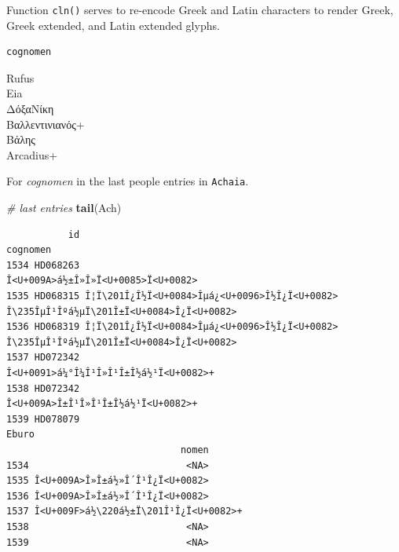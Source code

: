 \documentclass[a4paper,11pt]{memoir}
\newenvironment{Shaded}{\begin{snugshade}}{\end{snugshade}}
\newcommand{\CommentTok}[1]{\textcolor[rgb]{0.56,0.35,0.01}{\textit{#1}}}
\newcommand{\ErrorTok}[1]{\textcolor[rgb]{0.64,0.00,0.00}{\textbf{#1}}}
\newcommand{\KeywordTok}[1]{\textcolor[rgb]{0.13,0.29,0.53}{\textbf{#1}}}
\newcommand{\NormalTok}[1]{#1}
\newcommand{\OperatorTok}[1]{\textcolor[rgb]{0.81,0.36,0.00}{\textbf{#1}}}
\newcommand{\StringTok}[1]{\textcolor[rgb]{0.31,0.60,0.02}{#1}}
\begin{document}
Function \texttt{cln()} serves to re-encode Greek and Latin characters
to render Greek, Greek extended, and Latin extended glyphs.

\begin{Shaded}
\end{Shaded}

\begin{verbatim}
cognomen
\end{verbatim}

\noindent
Rufus \\
Eia \\
ΔόξαΝίκη \\
Βαλλεντινιανός+ \\
Βάλης \\
Arcadius+ \\

\bigbreak 

For \emph{cognomen} in the last people entries in \texttt{Achaia}.

\begin{Shaded}
\begin{Highlighting}[]
\CommentTok{# last entries}
\KeywordTok{tail}\NormalTok{(Ach)}
\end{Highlighting}
\end{Shaded}

\begin{verbatim}
           id                                                                       cognomen
1534 HD068263                                             Î<U+009A>á½±Î»Î»Ï<U+0085>Ï<U+0082>
1535 HD068315 Î¦Ï\201Î¿Î½Ï<U+0084>Îµá¿<U+0096>Î½Î¿Ï<U+0082> Î\235ÎµÎ¹Îºá½µÏ\201Î±Ï<U+0084>Î¿Ï<U+0082>
1536 HD068319 Î¦Ï\201Î¿Î½Ï<U+0084>Îµá¿<U+0096>Î½Î¿Ï<U+0082> Î\235ÎµÎ¹Îºá½µÏ\201Î±Ï<U+0084>Î¿Ï<U+0082>
1537 HD072342                                          Î<U+0091>á¼°Î¼Î¹Î»Î¹Î±Î½á½¹Ï<U+0082>+
1538 HD072342                                             Î<U+009A>Î±Î¹Î»Î¹Î±Î½á½¹Ï<U+0082>+
1539 HD078079                                                                          Eburo
                               nomen
1534                            <NA>
1535 Î<U+009A>Î»Î±á½»Î´Î¹Î¿Ï<U+0082>
1536 Î<U+009A>Î»Î±á½»Î´Î¹Î¿Ï<U+0082>
1537 Î<U+009F>á½\220á½±Ï\201Î¹Î¿Ï<U+0082>+
1538                            <NA>
1539                            <NA>
\end{verbatim}
\end{document}
